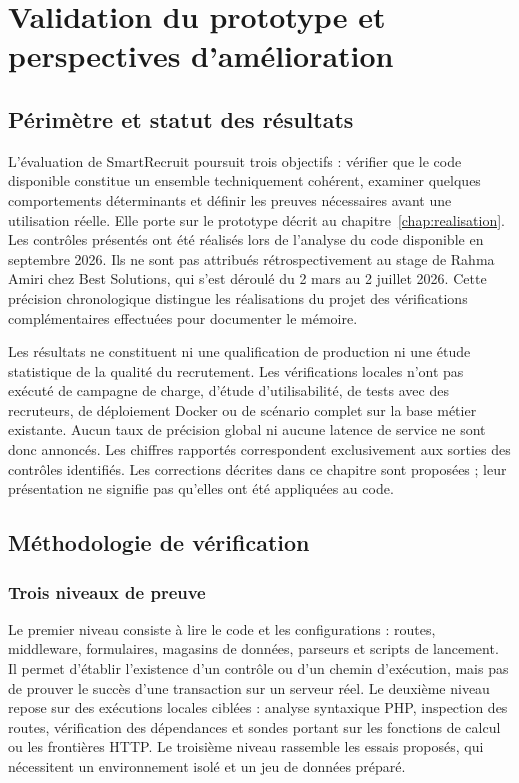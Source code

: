 \chapter{Validation du prototype et perspectives d'amélioration}
\label{chap:validation}

\section{Périmètre et statut des résultats}

L'évaluation de SmartRecruit poursuit trois objectifs : vérifier que le code disponible constitue un ensemble techniquement cohérent, examiner quelques comportements déterminants et définir les preuves nécessaires avant une utilisation réelle. Elle porte sur le prototype décrit au chapitre~\ref{chap:realisation}. Les contrôles présentés ont été réalisés lors de l'analyse du code disponible en septembre 2026. Ils ne sont pas attribués rétrospectivement au stage de Rahma Amiri chez Best Solutions, qui s'est déroulé du 2 mars au 2 juillet 2026. Cette précision chronologique distingue les réalisations du projet des vérifications complémentaires effectuées pour documenter le mémoire.

Les résultats ne constituent ni une qualification de production ni une étude statistique de la qualité du recrutement. Les vérifications locales n'ont pas exécuté de campagne de charge, d'étude d'utilisabilité, de tests avec des recruteurs, de déploiement Docker ou de scénario complet sur la base métier existante. Aucun taux de précision global ni aucune latence de service ne sont donc annoncés. Les chiffres rapportés correspondent exclusivement aux sorties des contrôles identifiés. Les corrections décrites dans ce chapitre sont proposées ; leur présentation ne signifie pas qu'elles ont été appliquées au code.

\section{Méthodologie de vérification}

\subsection{Trois niveaux de preuve}

Le premier niveau consiste à lire le code et les configurations : routes, middleware, formulaires, magasins de données, parseurs et scripts de lancement. Il permet d'établir l'existence d'un contrôle ou d'un chemin d'exécution, mais pas de prouver le succès d'une transaction sur un serveur réel. Le deuxième niveau repose sur des exécutions locales ciblées : analyse syntaxique PHP, inspection des routes, vérification des dépendances et sondes portant sur les fonctions de calcul ou les frontières HTTP. Le troisième niveau rassemble les essais proposés, qui nécessitent un environnement isolé et un jeu de données préparé.

